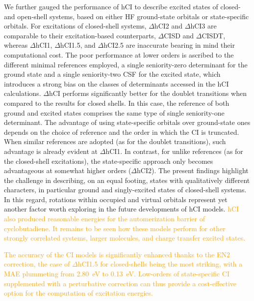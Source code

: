 \documentclass[aip,jcp,reprint,noshowkeys,superscriptaddress]{revtex4-1}
\newcommand{\fk}[1]{\textcolor{orange}{#1}}
\begin{document}
We further gauged the performance of hCI to describe excited states of closed- and open-shell systems, based on either HF ground-state orbitals or state-specific orbitals.
For excitations of closed-shell systems, $\Delta$hCI2 and $\Delta$hCI3 are comparable to their excitation-based counterparts, $\Delta$CISD and $\Delta$CISDT,
whereas $\Delta$hCI1, $\Delta$hCI1.5, and $\Delta$hCI2.5 are inaccurate bearing in mind their computational cost.
The poor performance at lower orders is ascribed to the different minimal references employed,
a single seniority-zero determinant for the ground state and a single seniority-two CSF for the excited state,
which introduces a strong bias on the classes of determinants accessed in the hCI calculations.
$\Delta$hCI performs significantly better for the doublet transitions when compared to the results for closed shells.
In this case, the reference of both ground and excited states comprises the same type of single seniority-one determinant.
The advantage of using state-specific orbitals over ground-state ones depends on the choice of reference and the order in which the CI is truncated.
When similar references are adopted (as for the doublet transitions), such advantage is already evident at $\Delta$hCI1.
In contrast, for unlike references (as for the closed-shell excitations), the state-specific approach only becomes advantageous at somewhat higher orders ($\Delta$hCI2).
The present findings highlight the challenge in describing, on an equal footing, states with qualitatively different characters, in particular ground and singly-excited states of closed-shell systems.
In this regard, rotations within occupied and virtual orbitals represent yet another factor worth exploring in the future developments of hCI models.
\fk{hCI also produced reasonable energies for the automerization barrier of cyclobutadiene.
It remains to be seen how these models perform for other strongly correlated systems, larger molecules, and charge transfer excited states.}

\fk{The accuracy of the CI models is significantly enhanced thanks to the EN2 correction,
the case of $\Delta$hCI1.5 for closed-shells being the most striking, with a MAE plummeting from \SI{2.80}{\eV} to \SI{0.13}{\eV}.
Low-orders of state-specific CI supplemented with a perturbative correction can thus provide a cost-effective option for the computation of excitation energies.
}
\end{document}
